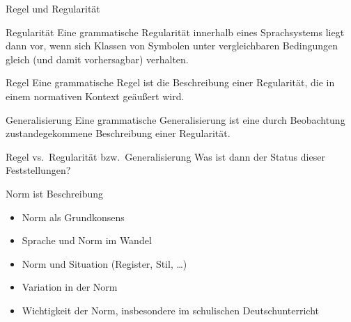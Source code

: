 \begin{frame}
  {Regel und Regularität}
  \pause
  \begin{block}{Regularität}
    Eine grammatische Regularität innerhalb eines Sprachsystems liegt dann vor, wenn sich Klassen von Symbolen unter vergleichbaren Bedingungen gleich (und damit vorhersagbar) verhalten.
  \end{block}

  \pause
  \vspace{0.5\baselineskip}

  \begin{block}{Regel}
    Eine grammatische Regel ist die Beschreibung einer Regularität, die in einem normativen Kontext geäußert wird.
  \end{block}

  \pause
  \vspace{0.5\baselineskip}
  
  \begin{block}{Generalisierung}
    Eine grammatische Generalisierung ist eine durch Beobachtung zustandegekommene Beschreibung einer Regularität.
  \end{block}
\end{frame}

\begin{frame}
  {Regel vs.\ Regularität bzw.\ Generalisierung}
  Was ist dann der Status dieser Feststellungen?\\
  \Zeile
  \begin{exe}
    \ex
    \begin{xlist}
    \end{xlist}
  \end{exe}
\end{frame}



\begin{frame}
  {Norm ist Beschreibung}
  \pause
  \begin{itemize}[<+->]
    \item Norm als Grundkonsens
    \item Sprache und Norm im Wandel
    \item Norm und Situation (Register, Stil, \dots)
    \item Variation in der Norm
      \vspace{\baselineskip}
    \item \alert{Wichtigkeit der Norm, insbesondere im schulischen Deutschunterricht}
  \end{itemize}
\end{frame}


